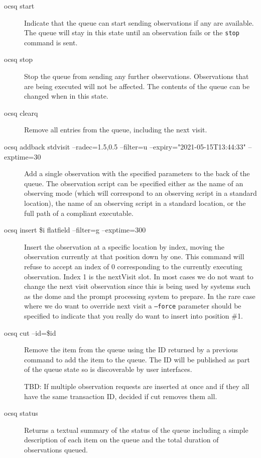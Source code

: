 \documentclass[TS,toc,lsstdraft]{lsstdoc}
\begin{document}
\begin{description}

\item[ocsq start] \hfill

Indicate that the queue can start sending observations if any are available.
The queue will stay in this state until an observation fails or the \texttt{stop} command is sent.

\item[ocsq stop] \hfill

Stop the queue from sending any further observations.
Observations that are being executed will not be affected.
The contents of the queue can be changed when in this state.

\item[ocsq clearq] \hfill

Remove all entries from the queue, including the next visit.

\item[ocsq addback stdvisit --radec=1.5,0.5 --filter=u --expiry="2021-05-15T13:44:33" --exptime=30]

Add a single observation with the specified parameters to the back of the queue.
The observation script can be specified either as the name of an observing mode (which will correspond to an observing script in a standard location), the name of an observing script in a standard location, or the full path of a compliant executable.


\item[ocsq insert \$i flatfield --filter=g --exptime=300]

Insert the observation at a specific location by index, moving the observation currently at that position down by one.
This command will refuse to accept an index of 0 corresponding to the currently executing observation.
Index 1 is the nextVisit slot.
In most cases we do not want to change the next visit observation since this is being used by systems such as the dome and the prompt processing system to prepare.
In the rare case where we do want to override next visit a \texttt{--force} parameter should be specified to indicate that you really do want to insert into position \#1.

\item[ocsq cut --id=\$id]

Remove the item from the queue using the ID returned by a previous command to add the item to the queue.
The ID will be published as part of the queue state so is discoverable by user interfaces.

TBD: If multiple observation requests are inserted at once and if they all have the same transaction ID, decided if cut removes them all.

\item[ocsq status]

Returns a textual summary of the status of the queue including a simple description of each item on the queue and the total duration of observations queued.

\end{description}
\end{document}
